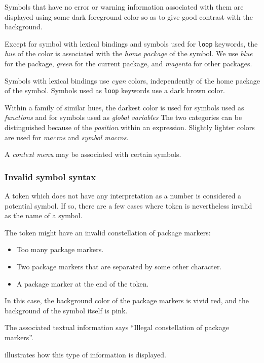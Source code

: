 Symbols that have no error or warning information associated with them
are displayed using some dark foreground color so as to give good
contrast with the background.  

Except for symbol with lexical bindings and symbols used for
\texttt{loop} keywords, the \emph{hue} of the color is associated with
the \emph{home package} of the symbol.  We use \emph{blue} for the
\cl{} package, \emph{green} for the current package, and
\emph{magenta} for other packages.

Symbols with lexical bindings use \emph{cyan} colors, independently of
the home package of the symbol.  Symbols used as \texttt{loop}
keywords use a dark brown color. 

Within a family of similar hues, the darkest color is used for symbols
used as \emph{functions} and for symbols used as \emph{global
  variables}  The two categories can be distinguished because of the
\emph{position} within an expression.  Slightly lighter colors are
used for \emph{macros} and \emph{symbol macros}.  

A \emph{context menu} may be associated with certain symbols.

\subsubsection{Invalid symbol syntax}

A token which does not have any interpretation as a number is
considered a potential symbol.  If so, there are a few cases where
token is nevertheless invalid as the name of a symbol.

The token might have an invalid constellation of package markers:

\begin{itemize}
\item Too many package markers.
\item Two package markers that are separated by some other character. 
\item A package marker at the end of the token.
\end{itemize}

In this case, the background color of the package markers is vivid
red, and the background of the symbol itself is pink. 

The associated textual information says ``Illegal constellation of
package markers''. 

 illustrates how this type of
information is displayed.

